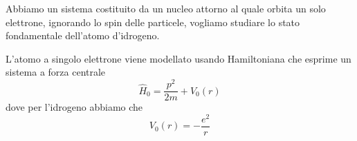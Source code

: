 Abbiamo un sistema costituito da un nucleo attorno al quale orbita un solo elettrone, ignorando lo spin delle particele, vogliamo studiare lo stato fondamentale dell'atomo d'idrogeno.

L'atomo a singolo elettrone viene modellato usando Hamiltoniana che esprime un sistema a forza centrale 
\begin{equation}
	\hat{H}_0 = \frac{p^2}{2m} + V_0(r)
\end{equation}
dove per l'idrogeno abbiamo che
\begin{equation*}
	V_0 (r) = - \frac{e^2}{r}
\end{equation*}



